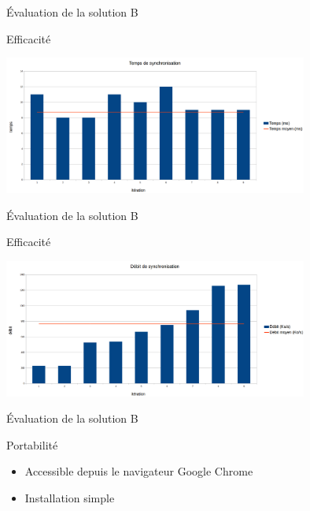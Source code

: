 \begin{frame}{\'Evaluation de la solution B}
	\begin{block}{Efficacité}
		\begin{center}
			\includegraphics[width=10cm]{images/tempsB.png}
		\end{center}
	\end{block}
\end{frame}

\begin{frame}{\'Evaluation de la solution B}
	\begin{block}{Efficacité}
		\begin{center}
			\includegraphics[width=10cm]{images/debitB.png}
		\end{center}
	\end{block}
\end{frame}

\begin{frame}{\'Evaluation de la solution B}
	\begin{block}{Portabilité}
		\begin{itemize}
			\item Accessible depuis le navigateur Google Chrome
			\item Installation simple
		\end{itemize}
	\end{block}
\end{frame}
